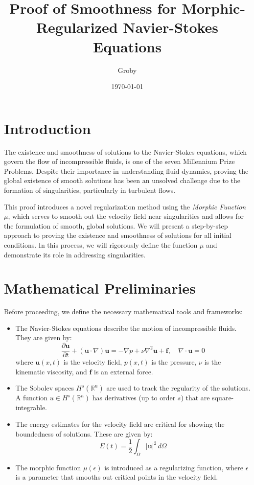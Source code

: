\documentclass{article}
\title{Proof of Smoothness for Morphic-Regularized Navier-Stokes Equations}
\author{Groby}
\date{\today}
\begin{document}
\maketitle

\section*{Introduction}

The existence and smoothness of solutions to the Navier-Stokes equations, which govern the flow of incompressible fluids, is one of the seven Millennium Prize Problems. Despite their importance in understanding fluid dynamics, proving the global existence of smooth solutions has been an unsolved challenge due to the formation of singularities, particularly in turbulent flows. 

This proof introduces a novel regularization method using the \textit{Morphic Function} \( \mu \), which serves to smooth out the velocity field near singularities and allows for the formulation of smooth, global solutions. We will present a step-by-step approach to proving the existence and smoothness of solutions for all initial conditions. In this process, we will rigorously define the function \( \mu \) and demonstrate its role in addressing singularities.

\section*{Mathematical Preliminaries}

Before proceeding, we define the necessary mathematical tools and frameworks:
\begin{itemize}
    \item The Navier-Stokes equations describe the motion of incompressible fluids. They are given by:
    \[
    \frac{\partial \mathbf{u}}{\partial t} + (\mathbf{u} \cdot \nabla) \mathbf{u} = -\nabla p + \nu \nabla^2 \mathbf{u} + \mathbf{f}, \quad \nabla \cdot \mathbf{u} = 0
    \]
    where \( \mathbf{u}(x,t) \) is the velocity field, \( p(x,t) \) is the pressure, \( \nu \) is the kinematic viscosity, and \( \mathbf{f} \) is an external force.
    \item The Sobolev spaces \( H^s(\mathbb{R}^n) \) are used to track the regularity of the solutions. A function \( u \in H^s(\mathbb{R}^n) \) has derivatives (up to order \( s \)) that are square-integrable.
    \item The energy estimates for the velocity field are critical for showing the boundedness of solutions. These are given by:
    \[
    E(t) = \frac{1}{2} \int_{\Omega} |\mathbf{u}|^2 \, d\Omega
    \]
    \item The morphic function \( \mu(\epsilon) \) is introduced as a regularizing function, where \( \epsilon \) is a parameter that smooths out critical points in the velocity field.
\end{itemize}
\end{document}
